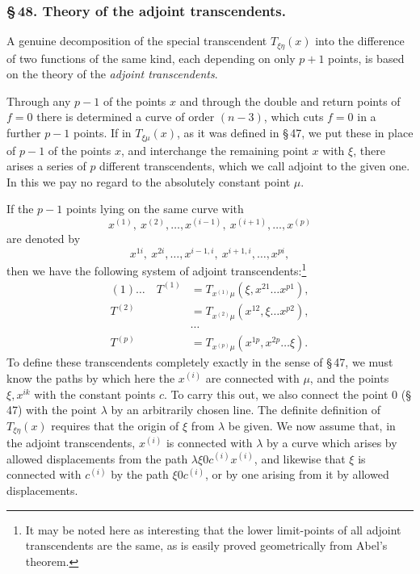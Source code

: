\documentclass[10pt]{article}
\begin{document}
\subsubsection*{\S\,48. Theory of the adjoint transcendents.}

A genuine decomposition of the special transcendent \(T_{\xi\eta}(x)\) into the difference of two functions of the same kind, each depending on only \(p+1\) points, is based on the theory of the \emph{adjoint transcendents}.

Through any \(p-1\) of the points \(x\) and through the double and return points of \(f=0\) there is determined a curve of order \((n-3)\), which cuts \(f=0\) in a further \(p-1\) points. If in \(T_{\xi\mu}(x)\), as it was defined in \S\,47, we put these in place of \(p-1\) of the points \(x\), and interchange the remaining point \(x\) with \(\xi\), there arises a series of \(p\) different transcendents, which we call adjoint to the given one. In this we pay no regard to the absolutely constant point \(\mu\).

If the \(p-1\) points lying on the same curve with
\[
x^{(1)},\ x^{(2)},\ldots,x^{(i-1)},\ x^{(i+1)},\ldots,x^{(p)}
\]
are denoted by
\[
x^{1i},\ x^{2i},\ldots,x^{i-1,i},\ x^{i+1,i},\ldots,x^{pi},
\]
then we have the following system of adjoint transcendents:\footnote{It may be noted here as interesting that the lower limit-points of all adjoint transcendents are the same, as is easily proved geometrically from Abel's theorem.}
\[
\begin{aligned}
(1)\ldots\quad T^{(1)}&=T_{x^{(1)}\mu}(\xi,x^{21}\ldots x^{p1}),\\
T^{(2)}&=T_{x^{(2)}\mu}(x^{12},\xi\ldots x^{p2}),\\[-0.35em]
&\cdots\\[-0.35em]
T^{(p)}&=T_{x^{(p)}\mu}(x^{1p},x^{2p}\ldots \xi).
\end{aligned}
\]
To define these transcendents completely exactly in the sense of \S\,47, we must know the paths by which here the \(x^{(i)}\) are connected with \(\mu\), and the points \(\xi,x^{ik}\) with the constant points \(c\). To carry this out, we also connect the point \(0\) (\S\,47) with the point \(\lambda\) by an arbitrarily chosen line. The definite definition of \(T_{\xi\eta}(x)\) requires that the origin of \(\xi\) from \(\lambda\) be given. We now assume that, in the adjoint transcendents, \(x^{(i)}\) is connected with \(\lambda\) by a curve which arises by allowed displacements from the path \(\lambda\xi0c^{(i)}x^{(i)}\), and likewise that \(\xi\) is connected with \(c^{(i)}\) by the path \(\xi0c^{(i)}\), or by one arising from it by allowed displacements.
\end{document}
